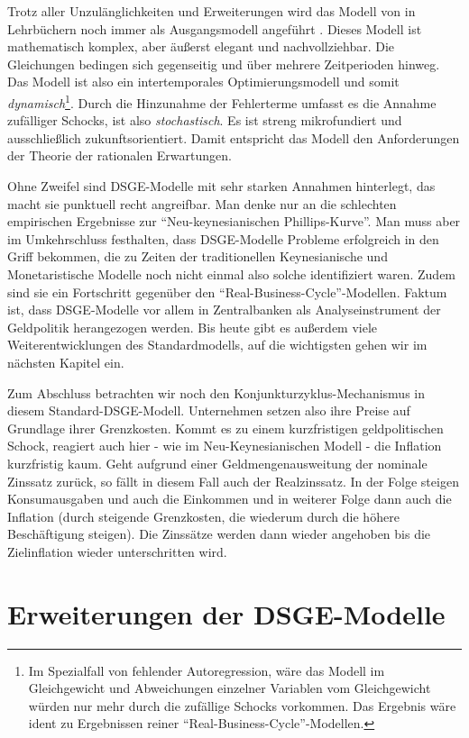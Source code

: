 Trotz aller Unzulänglichkeiten und Erweiterungen wird das Modell von \textcite{Gali2000} in Lehrbüchern noch immer als Ausgangsmodell angeführt \parencite[S. 350]{Romer2019}. Dieses Modell ist mathematisch komplex, aber äußerst elegant und nachvollziehbar. Die Gleichungen bedingen sich gegenseitig und über mehrere Zeitperioden hinweg. Das Modell ist also ein intertemporales Optimierungsmodell und somit \textit{dynamisch}\footnote{Im Spezialfall von fehlender Autoregression, wäre das Modell im Gleichgewicht und Abweichungen einzelner Variablen vom Gleichgewicht würden nur mehr durch die zufällige Schocks vorkommen. Das Ergebnis wäre ident zu Ergebnissen reiner "`Real-Business-Cycle"'-Modellen.}. Durch die Hinzunahme der Fehlerterme umfasst es die Annahme zufälliger Schocks, ist also \textit{stochastisch}. Es ist streng mikrofundiert und ausschließlich zukunftsorientiert. Damit entspricht das Modell den Anforderungen der Theorie der rationalen Erwartungen.

Ohne Zweifel sind DSGE-Modelle mit sehr starken Annahmen hinterlegt, das macht sie punktuell recht angreifbar. Man denke nur an die schlechten empirischen Ergebnisse zur "`Neu-keynesianischen Phillips-Kurve"'. Man muss aber im Umkehrschluss festhalten, dass DSGE-Modelle Probleme erfolgreich in den Griff bekommen, die zu Zeiten der traditionellen Keynesianische und Monetaristische Modelle noch nicht einmal also solche identifiziert waren. Zudem sind sie ein Fortschritt gegenüber den "`Real-Business-Cycle"'-Modellen. Faktum ist, dass DSGE-Modelle vor allem in Zentralbanken als Analyseinstrument der Geldpolitik herangezogen werden. Bis heute gibt es außerdem viele Weiterentwicklungen des Standardmodells, auf die wichtigsten gehen wir im nächsten Kapitel ein.

Zum Abschluss betrachten wir noch den Konjunkturzyklus-Mechanismus in diesem Standard-DSGE-Modell. Unternehmen setzen also ihre Preise auf Grundlage ihrer Grenzkosten. Kommt es zu einem kurzfristigen geldpolitischen Schock, reagiert auch hier - wie im Neu-Keynesianischen Modell - die Inflation kurzfristig kaum. Geht aufgrund einer Geldmengenausweitung der nominale Zinssatz zurück, so fällt in diesem Fall auch der Realzinssatz. In der Folge steigen Konsumausgaben und auch die Einkommen und in weiterer Folge dann auch die Inflation (durch steigende Grenzkosten, die wiederum durch die höhere Beschäftigung steigen). Die Zinssätze werden dann wieder angehoben bis die Zielinflation wieder unterschritten wird. 

\section{Erweiterungen der DSGE-Modelle}
\label{ErweiterungDSGE}

